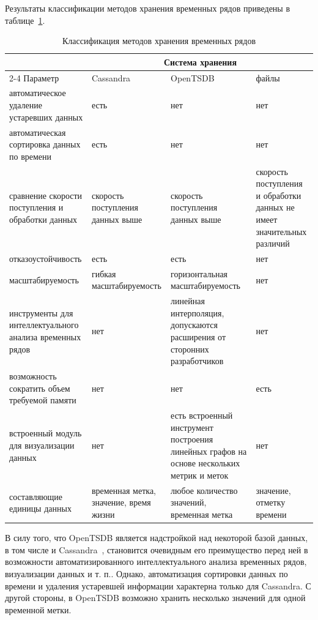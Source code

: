 Результаты классификации методов хранения временных рядов приведены в таблице~\ref{tab_mem}.
\begin{table}[h!]
    \caption{Классификация методов хранения временных рядов}
    \label{tab_mem}
    \centering
    \begin{tabular}{||p{4.2cm}||p{3cm}|p{5cm}|p{3cm}||}
        \hline
        & \multicolumn{3}{c|}{Система хранения} \\ \cline{2-4}
        Параметр & Cassandra & OpenTSDB & файлы\\
        \hline \hline
        {автоматическое удаление устаревших данных} & есть & нет & нет \\
        \hline
        {автоматическая сортировка данных по времени} & есть & нет & нет \\
        \hline
        {сравнение скорости поступления и обработки данных} &  {скорость поступления данных выше} &  {скорость поступления данных выше~\cite{itiref2}} &  {скорость поступления и обработки данных не имеет значительных различий}\\[8ex]
        \hline
        {отказоустойчивость} & есть & есть & нет\\
        \hline
        {масштабируемость} &{гибкая масштабируемость} &  {горизонтальная масштабируемость~\cite{itiref1}} & нет\\
        \hline
        {инструменты для интеллектуального анализа временных рядов} & нет &  {линейная интерполяция, допускаются расширения от сторонних разработчиков} & нет\\
        \hline
        {возможность сократить объем требуемой памяти} & нет & нет & есть\\
        \hline
        {встроенный модуль для визуализации данных} & нет &  {есть встроенный инструмент построения линейных графов на основе нескольких метрик и меток~\cite{itiref1}} & нет\\
        \hline
        {составляющие единицы данных} &  {временная метка, значение, время жизни} &  {любое количество значений, временная метка} & {значение, отметку времени}\\
        \hline \hline
    \end{tabular}
\end{table}
\clearpage

В силу того, что OpenTSDB является надстройкой над некоторой базой данных, в том числе и Cassandra~\cite{itiref3},
становится очевидным его преимущество перед ней в возможности автоматизированного интеллектуального анализа временных рядов,
визуализации данных и т. п..
Однако, автоматизация сортировки данных по времени и удаления устаревшей информации характерна только для Cassandra.
С другой стороны, в OpenTSDB возможно хранить несколько значений для одной временной метки.

